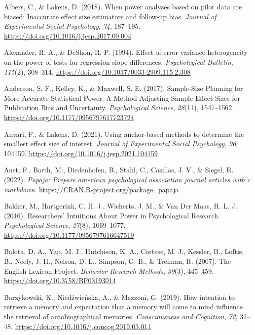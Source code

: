 \documentclass[
  man]{apa7}
\newlength{\cslhangindent}
\newenvironment{CSLReferences}[2] %
 {\begin{list}{}{%
  \setlength{\itemindent}{0pt}
  \setlength{\leftmargin}{0pt}
  \setlength{\parsep}{0pt}
  \ifodd #1
   \setlength{\leftmargin}{\cslhangindent}
   \setlength{\itemindent}{-1\cslhangindent}
  \fi
  \setlength{\itemsep}{#2\baselineskip}}}
 {\end{list}}
\begin{document}
\label{refs}
\begin{CSLReferences}{1}{0}
Albers, C., \& Lakens, D. (2018). When power analyses based on pilot data are biased: Inaccurate effect size estimators and follow-up bias. \emph{Journal of Experimental Social Psychology}, \emph{74}, 187--195. \url{https://doi.org/10.1016/j.jesp.2017.09.004}

Alexander, R. A., \& DeShon, R. P. (1994). Effect of error variance heterogeneity on the power of tests for regression slope differences. \emph{Psychological Bulletin}, \emph{115}(2), 308--314. \url{https://doi.org/10.1037/0033-2909.115.2.308}

Anderson, S. F., Kelley, K., \& Maxwell, S. E. (2017). Sample-Size Planning for More Accurate Statistical Power: A Method Adjusting Sample Effect Sizes for Publication Bias and Uncertainty. \emph{Psychological Science}, \emph{28}(11), 1547--1562. \url{https://doi.org/10.1177/0956797617723724}

Anvari, F., \& Lakens, D. (2021). Using anchor-based methods to determine the smallest effect size of interest. \emph{Journal of Experimental Social Psychology}, \emph{96}, 104159. \url{https://doi.org/10.1016/j.jesp.2021.104159}

Aust, F., Barth, M., Diedenhofen, B., Stahl, C., Casillas, J. V., \& Siegel, R. (2022). \emph{Papaja: Prepare american psychological association journal articles with r markdown}. \url{https://CRAN.R-project.org/package=papaja}

Bakker, M., Hartgerink, C. H. J., Wicherts, J. M., \& Van Der Maas, H. L. J. (2016). Researchers{'} Intuitions About Power in Psychological Research. \emph{Psychological Science}, \emph{27}(8), 1069--1077. \url{https://doi.org/10.1177/0956797616647519}

Balota, D. A., Yap, M. J., Hutchison, K. A., Cortese, M. J., Kessler, B., Loftis, B., Neely, J. H., Nelson, D. L., Simpson, G. B., \& Treiman, R. (2007). The English Lexicon Project. \emph{Behavior Research Methods}, \emph{39}(3), 445--459. \url{https://doi.org/10.3758/BF03193014}

Barzykowski, K., Niedźwieńska, A., \& Mazzoni, G. (2019). How intention to retrieve a memory and expectation that a memory will come to mind influence the retrieval of autobiographical memories. \emph{Consciousness and Cognition}, \emph{72}, 31--48. \url{https://doi.org/10.1016/j.concog.2019.03.011}


\end{CSLReferences}
\end{document}
